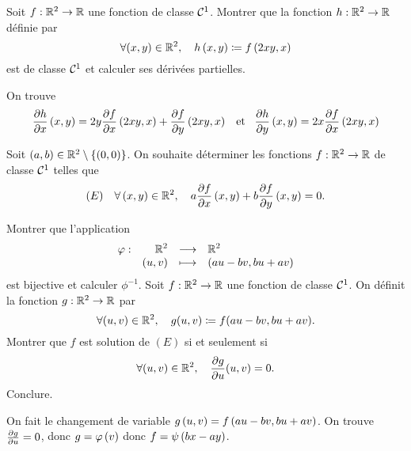 \documentclass{magnolia}
\begin{document}
\begin{exos}
\exo Soit $f:\mathbb{R}^2\to\mathbb{R}$ une fonction de classe $\mathcal{C}^{1}$. Montrer que la fonction
  $h:\mathbb{R}^2\to\mathbb{R}$ définie par
  \[\forall (x,y)\in\mathbb{R}^2,\quad h\left(x,y\right)\coloneqq f\left(2xy,x\right)\]
  est de classe $\mathcal{C}^{1}$ et calculer ses dérivées partielles.
  \begin{sol}
  On trouve
   \[\frac{\partial h}{\partial x}\left(x,y\right)=2y\frac{\partial f}{\partial x}\left(2xy,x\right)+\frac{\partial f}{\partial y}\left(2xy,x\right)
     \quad\!\text{et}\quad\! \frac{\partial h}{\partial y}\left(x,y\right)=2x\frac{\partial f}{\partial x}\left(2xy,x\right)\]
  \end{sol}
\exo Soit $\left(a,b\right)\in\mathbb{R}^2\setminus\left\{\left(0,0\right)\right\}$. On souhaite déterminer les fonctions
  $f:\mathbb{R}^2\to\mathbb{R}$ de classe $\mathcal{C}^{1}$ telles que
  \[(E) \quad \forall\left(x,y\right)\in\mathbb{R}^2 ,\quad
    a\frac{\partial f}{\partial x}\left(x,y\right)+b\frac{\partial f}{\partial y}\left(x,y\right)=0.\]
  \begin{questions}
  \question Montrer que l'application
    \[\begin{array}[t]{lrcl} \displaystyle{\varphi} : & \displaystyle{\mathbb{R}^2} & \longrightarrow & \displaystyle{\mathbb{R}^2} \\ & \displaystyle{(u,v)} & \longmapsto & \displaystyle{(au-bv,bu+av)} \end{array}\]
    est bijective et calculer $\phi^{-1}$.
  \question Soit $f:\mathbb{R}^2\to\mathbb{R}$ une fonction de classe $\mathcal{C}^{1}$. On définit
    la fonction $g:\mathbb{R}^2\to\mathbb{R}$ par
    \[\forall(u,v)\in\mathbb{R}^2,\quad g(u,v)\coloneqq f(au-bv,bu+av).\]
    Montrer que $f$ est solution de $(E)$ si et seulement si
    \[\forall(u,v)\in\mathbb{R}^2,\quad \frac{\partial g}{\partial u}(u,v)=0.\]
  \question Conclure.
  \end{questions}
  \begin{sol}%
  On fait le changement de variable
  $g\left(u,v\right)=f\left(au-bv,bu+av\right)$. On trouve $\frac{\partial g}{\partial u}=0$, donc
  $g=\varphi\left(v\right)$ donc $f=\psi\left(bx-ay\right)$.    
  \end{sol}
\end{exos}



\end{document}

